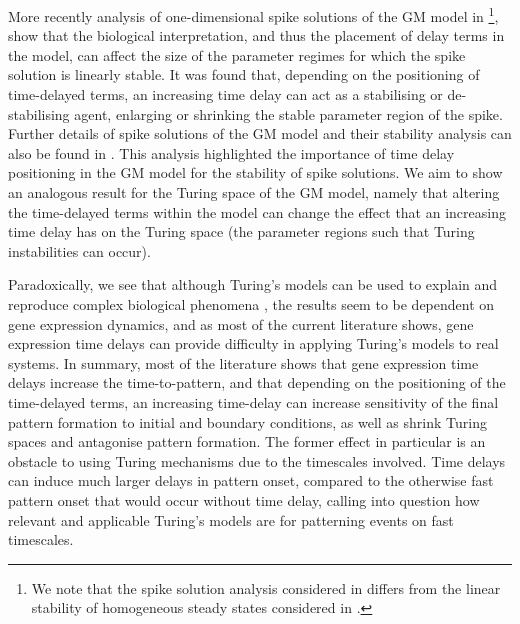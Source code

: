 More recently analysis of one-dimensional spike solutions of the GM model in \cite{fadai1,fadai2}\footnote{We note that the spike solution analysis considered in \cite{fadai1,fadai2} differs from the linear stability of homogeneous steady states considered in \cite{leegaffmonk,gaffmonk,leegaffney}.}, show that the biological interpretation, and thus the placement of delay terms in the model, can affect the size of the parameter regimes for which the spike solution is linearly stable. It was found that, depending on the positioning of time-delayed terms, an increasing time delay can act as a stabilising or de-stabilising agent, enlarging or shrinking the stable parameter region of the spike. Further details of spike solutions of the GM model and their stability analysis can also be found in \cite{spike}. This analysis highlighted the importance of time delay positioning in the GM model for the stability of spike solutions. We aim to show an analogous result for the Turing space of the GM model, namely that altering the time-delayed terms within the model can change the effect that an increasing time delay has on the Turing space (the parameter regions such that Turing instabilities can occur).

Paradoxically, we see that although Turing's models can be used to explain and reproduce complex biological phenomena \cite{leegaffney}, the results seem to be dependent on gene expression dynamics, and as most of the current literature shows, gene expression time delays can provide difficulty in applying Turing's models to real systems. In summary, most of the literature shows that gene expression time delays increase the time-to-pattern, and that depending on the positioning of the time-delayed terms, an increasing time-delay can increase sensitivity of the final pattern formation to initial and boundary conditions, as well as shrink Turing spaces and antagonise pattern formation. The former effect in particular is an obstacle to using Turing mechanisms due to the timescales involved. Time delays can induce much larger delays in pattern onset, compared to the otherwise fast pattern onset that would occur without time delay, calling into question how relevant and applicable Turing's models are for patterning events on fast timescales.

